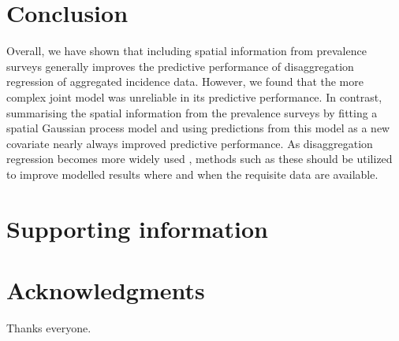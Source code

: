 \documentclass{statsoc}
\begin{document}
\section*{Conclusion}


Overall, we have shown that including spatial information from prevalence surveys generally improves the predictive performance of disaggregation regression of aggregated incidence data.
However, we found that the more complex joint model was unreliable in its predictive performance.
In contrast, summarising the spatial information from the prevalence surveys by fitting a spatial Gaussian process model and using predictions from this model as a new covariate nearly always improved predictive performance.
As disaggregation regression becomes more widely used \citep{weiss2019mapping, battle2019mapping}, methods such as these should be utilized to improve modelled results where and when the requisite data are available.


\section*{Supporting information}


\section*{Acknowledgments}
Thanks everyone.






 
\end{document}
